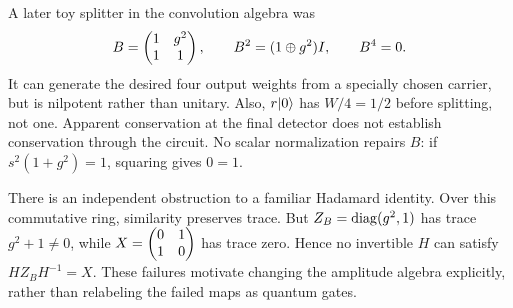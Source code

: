 A later toy splitter in the convolution algebra was
\begin{equation}
 B=\begin{pmatrix}1&g^2\\1&1\end{pmatrix},\qquad B^2=(1\oplus g^2)I,
 \qquad B^4=0.
\end{equation}
It can generate the desired four output weights from a specially chosen carrier, but is nilpotent rather than unitary. Also, $r\lvert 0\rangle$ has $W/4=1/2$ before splitting, not one. Apparent conservation at the final detector does not establish conservation through the circuit. No scalar normalization repairs $B$: if $s^2(1+g^2)=1$, squaring gives $0=1$.

There is an independent obstruction to a familiar Hadamard identity. Over this commutative ring, similarity preserves trace. But $Z_B=\operatorname{diag}(g^2,1)$ has trace $g^2+1\ne0$, while $X=\begin{pmatrix}0&1\\1&0\end{pmatrix}$ has trace zero. Hence no invertible $H$ can satisfy $HZ_BH^{-1}=X$. These failures motivate changing the amplitude algebra explicitly, rather than relabeling the failed maps as quantum gates.
